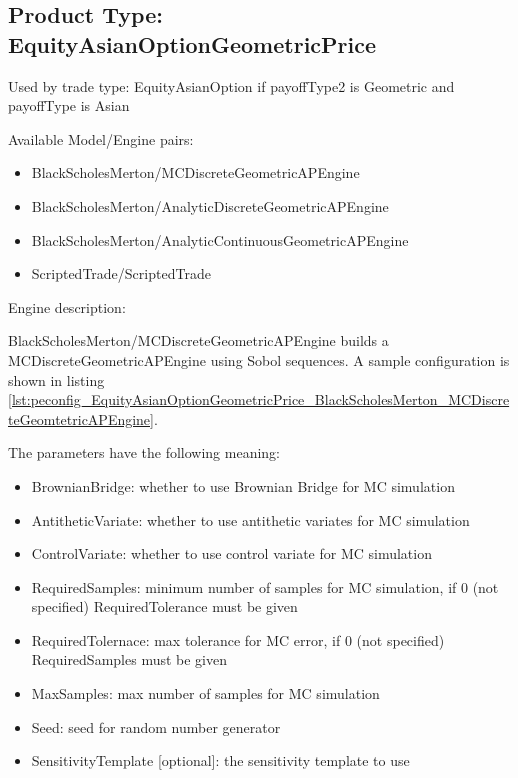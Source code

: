 \subsection{Product Type: EquityAsianOptionGeometricPrice}

Used by trade type: EquityAsianOption if payoffType2 is Geometric and payoffType is Asian

Available Model/Engine pairs:

\begin{itemize}
  \item BlackScholesMerton/MCDiscreteGeometricAPEngine
  \item BlackScholesMerton/AnalyticDiscreteGeometricAPEngine
  \item BlackScholesMerton/AnalyticContinuousGeometricAPEngine
  \item ScriptedTrade/ScriptedTrade
\end{itemize}

Engine description:

BlackScholesMerton/MCDiscreteGeometricAPEngine builds a MCDiscreteGeometricAPEngine using Sobol sequences. A sample
configuration is shown in listing
\ref{lst:peconfig_EquityAsianOptionGeometricPrice_BlackScholesMerton_MCDiscreteGeomtetricAPEngine}.

The parameters have the following meaning:

\begin{itemize}
\item BrownianBridge: whether to use Brownian Bridge for MC simulation
\item AntitheticVariate: whether to use antithetic variates for MC simulation
\item ControlVariate: whether to use control variate for MC simulation
\item RequiredSamples: minimum number of samples for MC simulation, if 0 (not specified) RequiredTolerance must be given
\item RequiredTolernace: max tolerance for MC error, if 0 (not specified) RequiredSamples must be given
\item MaxSamples: max number of samples for MC simulation
\item Seed: seed for random number generator
\item SensitivityTemplate [optional]: the sensitivity template to use 
\end{itemize}

